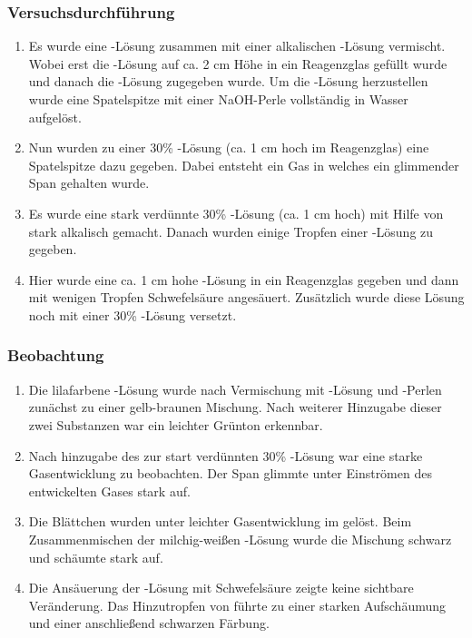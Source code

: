 \documentclass{scrartcl}
\begin{document}
 \subsubsection{Versuchsdurchführung}
 \begin{enumerate}[label=\alph*)]
	 \item Es wurde eine -Lösung zusammen mit einer alkalischen -Lösung vermischt. Wobei erst die -Lösung auf ca. 2 cm Höhe in ein Reagenzglas gefüllt wurde und danach die -Lösung zugegeben wurde. Um die -Lösung herzustellen wurde eine Spatelspitze  mit einer NaOH-Perle vollständig in Wasser aufgelöst.
	 \item Nun wurden zu einer 30\% -Lösung (ca. 1 cm hoch im Reagenzglas) eine Spatelspitze  dazu gegeben. Dabei entsteht ein Gas in welches ein glimmender Span gehalten wurde.
	 \item Es wurde eine stark verdünnte 30\% -Lösung (ca. 1 cm hoch) mit Hilfe von  stark alkalisch gemacht. Danach wurden einige Tropfen einer -Lösung zu gegeben.
	 \item Hier wurde eine ca. 1 cm hohe -Lösung in ein Reagenzglas gegeben und dann mit wenigen Tropfen Schwefelsäure angesäuert. Zusätzlich wurde diese Lösung noch mit einer 30\% -Lösung versetzt.
 \end{enumerate}
 \subsubsection{Beobachtung}
 \begin{enumerate}[label=\alph*)]
	 \item Die lilafarbene -Lösung wurde nach Vermischung mit -Lösung und -Perlen zunächst zu einer gelb-braunen Mischung. Nach weiterer Hinzugabe dieser zwei Substanzen war ein leichter Grünton erkennbar.
	 \item Nach hinzugabe des  zur start verdünnten 30\% -Lösung war eine starke Gasentwicklung zu beobachten. Der Span glimmte unter Einströmen des entwickelten Gases stark auf. 
	 \item Die  Blättchen wurden unter leichter Gasentwicklung im  gelöst. Beim Zusammenmischen der milchig-weißen -Lösung wurde die Mischung schwarz und schäumte stark auf.
	 \item Die Ansäuerung der -Lösung mit Schwefelsäure zeigte keine sichtbare Veränderung. Das Hinzutropfen von  führte zu einer starken Aufschäumung und einer anschließend schwarzen Färbung.
 \end{enumerate}
\end{document}
